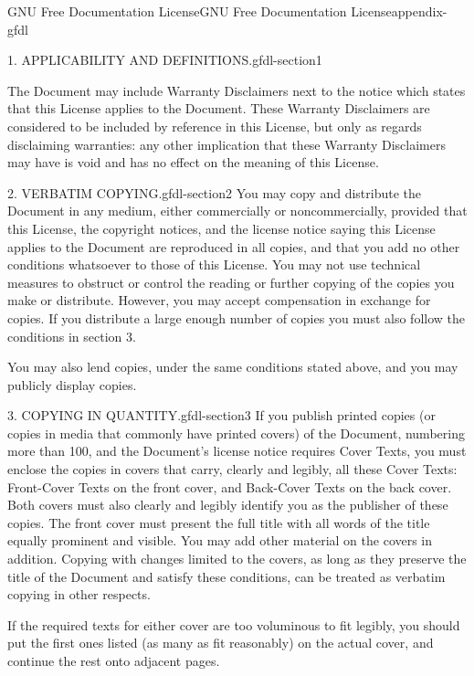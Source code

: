 \documentclass[oneside,10pt,]{book}
\numberwithin{equation}{section}
\begin{document}
\begin{appendixptx}{GNU Free Documentation License}{}{GNU Free Documentation License}{}{}{appendix-gfdl}
\begin{paragraphs}{1. APPLICABILITY AND DEFINITIONS.}{gfdl-section1}
\par
\hypertarget{p-1571}{}%
The Document may include Warranty Disclaimers next to the notice which states that this License applies to the Document. These Warranty Disclaimers are considered to be included by reference in this License, but only as regards disclaiming warranties: any other implication that these Warranty Disclaimers may have is void and has no effect on the meaning of this License.%
\end{paragraphs}%
\begin{paragraphs}{2. VERBATIM COPYING.}{gfdl-section2}%
\hypertarget{p-1572}{}%
You may copy and distribute the Document in any medium, either commercially or noncommercially, provided that this License, the copyright notices, and the license notice saying this License applies to the Document are reproduced in all copies, and that you add no other conditions whatsoever to those of this License. You may not use technical measures to obstruct or control the reading or further copying of the copies you make or distribute. However, you may accept compensation in exchange for copies. If you distribute a large enough number of copies you must also follow the conditions in section 3.%
\par
\hypertarget{p-1573}{}%
You may also lend copies, under the same conditions stated above, and you may publicly display copies.%
\end{paragraphs}%
\begin{paragraphs}{3. COPYING IN QUANTITY.}{gfdl-section3}%
\hypertarget{p-1574}{}%
If you publish printed copies (or copies in media that commonly have printed covers) of the Document, numbering more than 100, and the Document's license notice requires Cover Texts, you must enclose the copies in covers that carry, clearly and legibly, all these Cover Texts: Front-Cover Texts on the front cover, and Back-Cover Texts on the back cover. Both covers must also clearly and legibly identify you as the publisher of these copies. The front cover must present the full title with all words of the title equally prominent and visible. You may add other material on the covers in addition. Copying with changes limited to the covers, as long as they preserve the title of the Document and satisfy these conditions, can be treated as verbatim copying in other respects.%
\par
\hypertarget{p-1575}{}%
If the required texts for either cover are too voluminous to fit legibly, you should put the first ones listed (as many as fit reasonably) on the actual cover, and continue the rest onto adjacent pages.%

\end{paragraphs}
\end{appendixptx}
\end{document}
